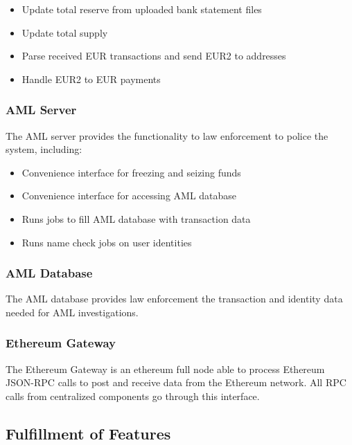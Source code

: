 \documentclass[12pt]{article} %
\begin{document}
{\begin{itemize}
	\item Update total reserve from uploaded bank statement files
	\item Update total supply
	\item Parse received EUR transactions and send EUR2 to addresses
	\item Handle EUR2 to EUR payments
\end{itemize}

\subsubsection{AML Server} \label{sssec:3.5:amlServer}

The AML server provides the functionality to law enforcement to police the system, including:

\begin{itemize}
	\item Convenience interface for freezing and seizing funds
	\item Convenience interface for accessing AML database
	\item Runs jobs to fill AML database with transaction data
	\item Runs name check jobs on user identities
\end{itemize}

\subsubsection{AML Database} \label{sssec:3.5:amlDatabase}

The AML database provides law enforcement the transaction and identity data needed for AML investigations.

\subsubsection{Ethereum Gateway} \label{sssec:3.5:ethereumGateway}

The Ethereum Gateway is an ethereum full node able to process Ethereum JSON-RPC calls to post and receive data from the Ethereum network. All RPC calls from centralized components go through this interface.

\subsection{Fulfillment of Features} \label{ssec:3.6}

}
\end{document}
